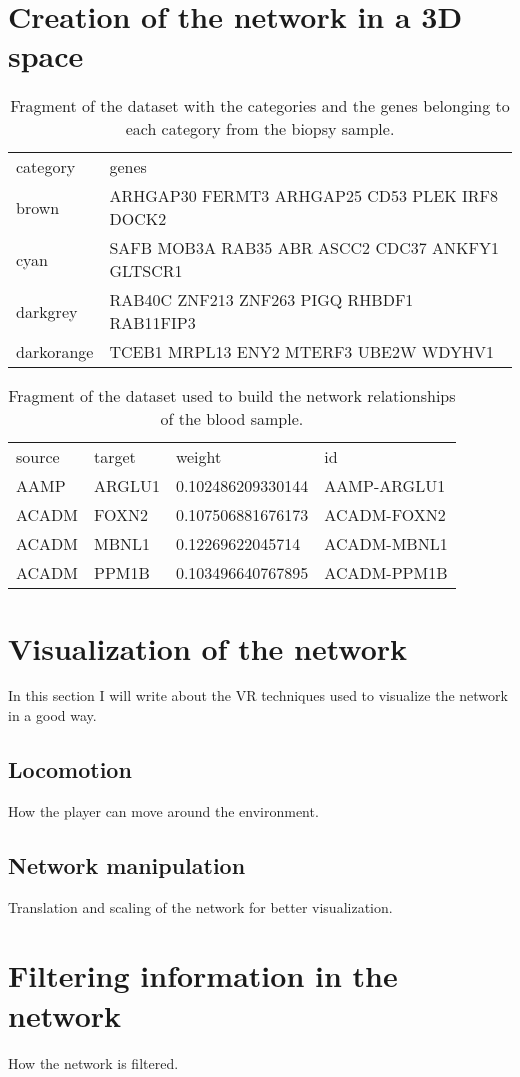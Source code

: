 \section{Creation of the network in a 3D space}

\begin{table}[h!]
\centering
\begin{tabular}{ll}
\hline
category & genes          \\
brown   & ARHGAP30 FERMT3 ARHGAP25 CD53 PLEK IRF8 DOCK2\\
cyan  & SAFB MOB3A RAB35 ABR ASCC2 CDC37 ANKFY1 GLTSCR1\\
darkgrey  & RAB40C ZNF213 ZNF263 PIGQ RHBDF1 RAB11FIP3\\
darkorange  & TCEB1 MRPL13 ENY2 MTERF3 UBE2W WDYHV1\\
\hline
\end{tabular}
\caption{Fragment of the dataset with the categories and the genes belonging to each category from the biopsy sample.}
\label{tab:categories-data}
\end{table}

\begin{table}[h!]
\centering
\begin{tabular}{llll}
\hline
source & target & weight            & id          \\
AAMP   & ARGLU1 & 0.102486209330144 & AAMP-ARGLU1 \\
ACADM  & FOXN2  & 0.107506881676173 & ACADM-FOXN2 \\
ACADM  & MBNL1  & 0.12269622045714  & ACADM-MBNL1 \\
ACADM  & PPM1B  & 0.103496640767895 & ACADM-PPM1B \\
\hline
\end{tabular}
\caption{Fragment of the dataset used to build the network relationships of the blood sample.}
\label{tab:network-data}
\end{table}

\section{Visualization of the network}
In this section I will write about the VR techniques used to visualize the network in a good way.

\subsection{Locomotion}
How the player can move around the environment.

\subsection{Network manipulation}
Translation and scaling of the network for better visualization.

\section{Filtering information in the network}
How the network is filtered.
